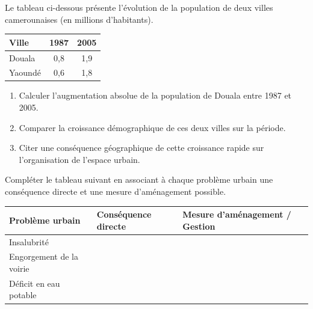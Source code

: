 \documentclass[11pt]{article}
\begin{document}
\begin{exercice}
Le tableau ci-dessous présente l'évolution de la population de deux villes camerounaises (en millions d'habitants).

\begin{center}
\begin{tabular}{|l|c|c|}
\hline
\textbf{Ville} & \textbf{1987} & \textbf{2005} \\
\hline
Douala & 0,8 & 1,9 \\
Yaoundé & 0,6 & 1,8 \\
\hline
\end{tabular}
\end{center}

\begin{enumerate}
    \item Calculer l'augmentation absolue de la population de Douala entre 1987 et 2005.
    \item Comparer la croissance démographique de ces deux villes sur la période.
    \item Citer une conséquence géographique de cette croissance rapide sur l'organisation de l'espace urbain.
\end{enumerate}
\end{exercice}

\begin{exercice}
Compléter le tableau suivant en associant à chaque problème urbain une conséquence directe et une mesure d'aménagement possible.

\begin{center}
\begin{tabular}{|p{3cm}|p{5cm}|p{5cm}|}
\hline
\textbf{Problème urbain} & \textbf{Conséquence directe} & \textbf{Mesure d'aménagement / Gestion} \\
\hline
Insalubrité & \underline{\hspace{5cm}} & \underline{\hspace{5cm}} \\
\hline
Engorgement de la voirie & \underline{\hspace{5cm}} & \underline{\hspace{5cm}} \\
\hline
Déficit en eau potable & \underline{\hspace{5cm}} & \underline{\hspace{5cm}} \\
\hline
\end{tabular}
\end{center}
\end{exercice}
\end{document}
